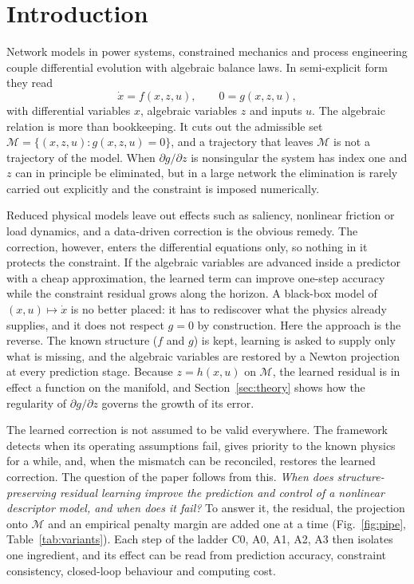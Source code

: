 \documentclass[preprint,12pt]{elsarticle}
\begin{document}
\section{Introduction}
\label{sec:intro}
Network models in power systems, constrained mechanics and process engineering couple differential evolution with algebraic balance laws. In semi-explicit form they read
\begin{equation}
\dot x = f(x,z,u),\qquad 0 = g(x,z,u),
\label{eq:dae}
\end{equation}
with differential variables $x$, algebraic variables $z$ and inputs $u$. The algebraic relation is more than bookkeeping. It cuts out the admissible set $\mathcal M=\{(x,z,u):g(x,z,u)=0\}$, and a trajectory that leaves $\mathcal M$ is not a trajectory of the model. When $\partial g/\partial z$ is nonsingular the system has index one and $z$ can in principle be eliminated, but in a large network the elimination is rarely carried out explicitly and the constraint is imposed numerically.

Reduced physical models leave out effects such as saliency, nonlinear friction or load dynamics, and a data-driven correction is the obvious remedy. The correction, however, enters the differential equations only, so nothing in it protects the constraint. If the algebraic variables are advanced inside a predictor with a cheap approximation, the learned term can improve one-step accuracy while the constraint residual grows along the horizon. A black-box model of $(x,u)\mapsto\dot x$ is no better placed: it has to rediscover what the physics already supplies, and it does not respect $g=0$ by construction. Here the approach is the reverse. The known structure ($f$ and $g$) is kept, learning is asked to supply only what is missing, and the algebraic variables are restored by a Newton projection at every prediction stage. Because $z=h(x,u)$ on $\mathcal M$, the learned residual is in effect a function on the manifold, and Section~\ref{sec:theory} shows how the regularity of $\partial g/\partial z$ governs the growth of its error.

The learned correction is not assumed to be valid everywhere. The framework detects when its operating assumptions fail, gives priority to the known physics for a while, and, when the mismatch can be reconciled, restores the learned correction. The question of the paper follows from this. \emph{When does structure-preserving residual learning improve the prediction and control of a nonlinear descriptor model, and when does it fail?} To answer it, the residual, the projection onto $\mathcal M$ and an empirical penalty margin are added one at a time (Fig.~\ref{fig:pipe}, Table~\ref{tab:variants}). Each step of the ladder C0, A0, A1, A2, A3 then isolates one ingredient, and its effect can be read from prediction accuracy, constraint consistency, closed-loop behaviour and computing cost.
\end{document}

